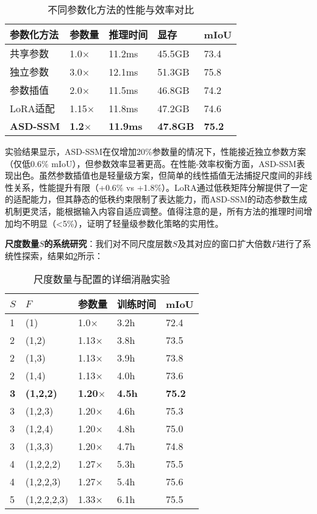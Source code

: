 \documentclass[preprint,12pt]{elsarticle}
\begin{document}
\begin{table}[htbp!]
	\centering
	\caption{不同参数化方法的性能与效率对比}
	\label{tab:parameterization_comparison}
	\begin{tabular}{@{}lllll@{}}
		\toprule
		参数化方法 & 参数量 & 推理时间 & 显存 & mIoU \\
		\midrule
		共享参数 & 1.0$\times$ & 11.2ms & 45.5GB & 73.4 \\
		\midrule
		独立参数 & 3.0$\times$ & 12.1ms & 51.3GB & 75.8 \\
		参数插值 & 2.0$\times$ & 11.5ms & 46.8GB & 74.2 \\
		LoRA适配 & 1.15$\times$ & 11.8ms & 47.2GB & 74.6 \\
		\textbf{ASD-SSM} & \textbf{1.2$\times$} & \textbf{11.9ms} & \textbf{47.8GB} & \textbf{75.2} \\
		\bottomrule
	\end{tabular}
\end{table}

实验结果显示，ASD-SSM在仅增加20\%参数量的情况下，性能接近独立参数方案（仅低0.6\% mIoU），但参数效率显著更高。在性能-效率权衡方面，ASD-SSM表现出色。虽然参数插值也是轻量级方案，但简单的线性插值无法捕捉尺度间的非线性关系，性能提升有限（+0.6\% vs +1.8\%）。LoRA通过低秩矩阵分解提供了一定的适配能力，但其静态的低秩约束限制了表达能力，而ASD-SSM的动态参数生成机制更灵活，能根据输入内容自适应调整。值得注意的是，所有方法的推理时间增加均不明显（<5\%），证明了轻量级参数化策略的实用性。

\textbf{尺度数量$S$的系统研究}：我们对不同尺度层数$S$及其对应的窗口扩大倍数$F$进行了系统性探索，结果如\cref{tab:scale_number}所示：

\begin{table}[htbp!]
	\centering
	\caption{尺度数量与配置的详细消融实验}
	\label{tab:scale_number}
	\begin{tabular}{@{}lllll@{}}
		\toprule
		$S$ & $F$ & 参数量 & 训练时间 & mIoU \\
		\midrule
		1 & (1) & 1.0$\times$ & 3.2h & 72.4 \\
		\midrule
		2 & (1,2) & 1.13$\times$ & 3.8h & 73.5 \\
		2 & (1,3) & 1.13$\times$ & 3.9h & 73.8 \\
		2 & (1,4) & 1.13$\times$ & 4.0h & 73.6 \\
		\midrule
		\textbf{3} & \textbf{(1,2,2)} & \textbf{1.20$\times$} & \textbf{4.5h} & \textbf{75.2} \\
		3 & (1,2,3) & 1.20$\times$ & 4.6h & 75.3 \\
		3 & (1,2,4) & 1.20$\times$ & 4.8h & 75.0 \\
		3 & (1,3,3) & 1.20$\times$ & 4.7h & 74.8 \\
		\midrule
		4 & (1,2,2,2) & 1.27$\times$ & 5.3h & 75.5 \\
		4 & (1,2,2,3) & 1.27$\times$ & 5.4h & 75.6 \\
		5 & (1,2,2,2,3) & 1.33$\times$ & 6.1h & 75.5 \\
		\bottomrule
	\end{tabular}
\end{table}
\end{document}
